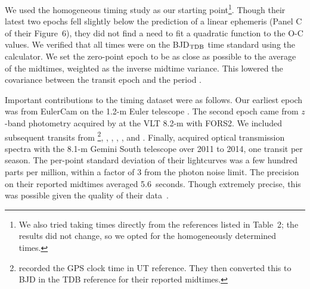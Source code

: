 \documentclass[12pt,twocolumn,tighten]{aastex62}
\begin{document}
We used the homogeneous \citet{hoyer_tramos_2013} timing study as our
starting point\footnote{We also tried taking times directly from the
references listed in Table~2; the results did not change, so we opted
for the homogeneously determined \citet{hoyer_tramos_2013} times.}.
Though their latest two epochs fell slightly below the prediction of a
linear ephemeris (Panel C of their Figure~6), they did not find a need
to fit a quadratic function to the O-C values.  We verified that all
times were on the BJD$_{\rm TDB}$ time standard using the
\citet{eastman_achieving_2010} calculator.  We set the zero-point
epoch to be as close as possible to the average of the midtimes,
weighted as the inverse midtime variance. This lowered the
covariance between the transit epoch and the period
\citep{gibson_gemini_2013}.

Important contributions to the timing dataset were as follows.  Our
earliest epoch was from EulerCam on the 1.2-m Euler telescope
\citep{wilson_wasp-4b_2008}.  The second epoch came from $z$-band
photometry acquired by \citet{gillon_improved_2009} at the VLT 8.2-m
with FORS2.  We included subsequent transits from
\citet{winn_transit_2009}\footnote{\citet{winn_transit_2009} recorded
the GPS clock time in UT reference. They then converted this to BJD in
the TDB reference for their reported midtimes.},
\citet{dragomir_terms_2011}, \citet{sanchis-ojeda_starspots_2011},
\citet{nikolov_wasp-4b_2012}, \citet{hoyer_tramos_2013}, and
\citet{ranjan_atmospheric_2014}.  Finally, \citet{huitson_gemini_2017}
acquired optical transmission spectra with the 8.1-m Gemini South
telescope over 2011 to 2014, one transit per season.  The per-point
standard deviation of their lightcurves was a few hundred parts per
million, within a factor of 3 from the photon noise limit.  The
precision on their reported midtimes averaged 5.6~seconds. Though
extremely precise, this was possible given the quality of their
data~\citep{carter_analytic_2008}.
\end{document}
